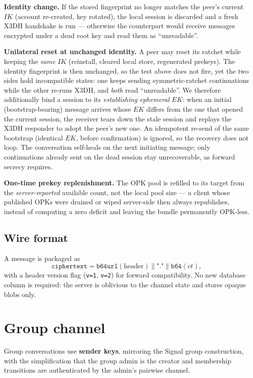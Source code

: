 \documentclass[11pt,a4paper]{article}
\newcommand{\code}[1]{\texttt{\small #1}}
\begin{document}
\textbf{Identity change.} If the stored fingerprint no longer matches the
peer's current $IK$ (account re-created, key rotated), the local session is
discarded and a fresh X3DH handshake is run --- otherwise the counterpart
would receive messages encrypted under a dead root key and read them as
``unreadable''.

\textbf{Unilateral reset at unchanged identity.} A peer may reset its
ratchet while keeping the \emph{same} $IK$ (reinstall, cleared local store,
regenerated prekeys). The identity fingerprint is then unchanged, so the
test above does not fire, yet the two sides hold incompatible states: one
keeps sending symmetric-ratchet continuations while the other re-runs X3DH,
and \emph{both} read ``unreadable''. We therefore additionally bind a
session to its \emph{establishing ephemeral} $EK$: when an initial
(bootstrap-bearing) message arrives whose $EK$ differs from the one that
opened the current session, the receiver tears down the stale session and
replays the X3DH responder to adopt the peer's new one. An idempotent
re-send of the same bootstrap (identical $EK$, before confirmation) is
ignored, so the recovery does not loop. The conversation self-heals on the
next initiating message; only continuations already sent on the dead
session stay unrecoverable, as forward secrecy requires.

\textbf{One-time prekey replenishment.} The OPK pool is refilled to its
target from the \emph{server-reported} available count, not the local pool
size --- a client whose published OPKs were drained or wiped server-side
then always republishes, instead of computing a zero deficit and leaving
the bundle permanently OPK-less.

\subsection{Wire format}

A message is packaged as
\[
\texttt{ciphertext} = \texttt{b64url}(\text{header}) \| \texttt{"."} \| \texttt{b64}(ct),
\]
with a header version flag (\code{v=1}, \code{v=2}) for forward
compatibility. No new database column is required: the server is oblivious
to the channel state and stores opaque blobs only.

\section{Group channel}

Group conversations use \textbf{sender keys}, mirroring the Signal group
construction, with the simplification that the group admin is the
creator and membership transitions are authenticated by the admin's
pairwise channel.
\end{document}
